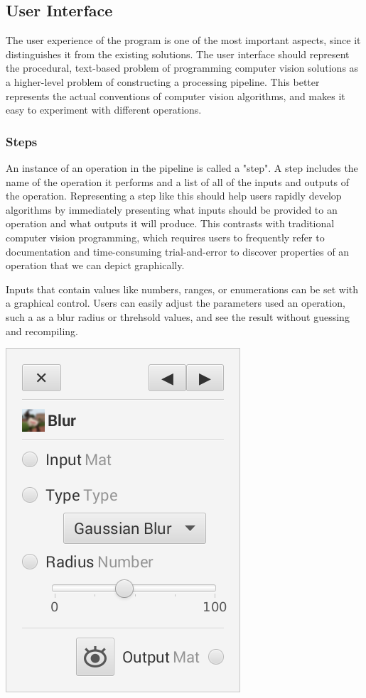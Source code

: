 \documentclass[12pt]{article}
\begin{document}
\subsection{User Interface}
The user experience of the program is one of the most important aspects, since
it distinguishes it from the existing solutions.  The user interface should
represent the procedural, text-based problem of programming computer vision
solutions as a higher-level problem of constructing a processing pipeline.
This better represents the actual conventions of computer vision algorithms,
and makes it easy to experiment with different operations.

\subsubsection{Steps}
An instance of an operation in the pipeline is called a "step".  A step includes the name of the operation it performs and a list of all of the inputs and outputs of the operation.  Representing a step like this should help users rapidly develop algorithms by immediately presenting what inputs should be provided to an operation and what outputs it will produce.  This contrasts with traditional computer vision programming, which requires users to frequently refer to documentation and time-consuming trial-and-error to discover properties of an operation that we can depict graphically.
\par
Inputs that contain values like numbers, ranges, or enumerations can be set with a graphical control.  Users can easily adjust the parameters used an operation, such a as a blur radius or threhsold values, and see the result without guessing and recompiling.\\[0.5 cm]

\centerline{
    \includegraphics[scale = 0.5]{step.png}
}
\end{document}
